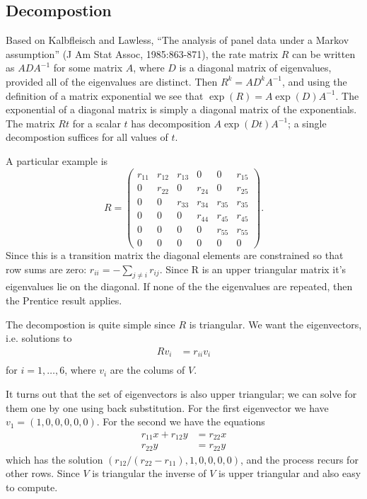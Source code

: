 \documentclass{article}
\begin{document}
\subsection{Decompostion}
Based on Kalbfleisch and Lawless, ``The analysis of panel data under a 
Markov assumption'' (J Am Stat Assoc, 1985:863-871), the
rate matrix $R$ can be written as $ADA^{-1}$ for some matrix $A$, where
$D$ is a diagonal matrix of eigenvalues, provided all of the eigenvalues
are distinct.  Then $R^k = A D^k A^{-1}$, and using the definition of
a matrix exponential we see that
$\exp(R) = A \exp(D) A^{-1}$.  The exponential of a diagonal
matrix is simply a diagonal matrix of the exponentials.
The matrix $Rt$ for a scalar $t$ has decomposition $A\exp(Dt)A^{-1}$; a
single decompostion suffices for all values of $t$.

A particular example is
\begin{equation}
  R =
  \begin{pmatrix}
    r_{11} & r_{12} & r_{13} & 0 & 0 & r_{15}\\
    0 & r_{22} & 0 & r_{24} & 0 & r_{25}\\
    0 & 0 & r_{33} & r_{34} & r_{35} & r_{35}\\
    0 & 0 & 0 & r_{44} & r_{45} & r_{45} \\
    0 & 0 & 0 & 0 & r_{55} & r_{55} \\
    0 & 0 & 0 & 0 & 0 & 0
  \end{pmatrix}.
\end{equation}
Since this is a transition matrix the diagonal elements are constrained so that
row sums are zero: $r_{ii} = -\sum_{j\ne i} r_{ij}$.
Since R is an upper triangular matrix it's eigenvalues lie on the diagonal.
If none of the the eigenvalues are
repeated, then the Prentice result applies.

The decompostion is quite simple since $R$ is triangular.
We want the eigenvectors, i.e. solutions to 
\begin{align*}
  R v_i &= r_{ii} v_i \\
\end{align*}
for $i= 1, \dots, 6$, where $v_i$ are the colums of $V$. 

It turns out that the set of eigenvectors is
also upper triangular; we can solve for them one by one
using back substitution.
For the first eigenvector we have 
$v_1 = (1, 0,0,0,0,0)$.
For the second we have the equations
\begin{align*}
  r_{11} x + r_{12}y &=  r_{22} x \\
             r_{22}y &=  r_{22} y
\end{align*}
which has the solution $(r_{12}/(r_{22}- r_{11}), 1, 0,0,0,0)$,
and the process recurs for other rows.
Since $V$ is triangular the inverse of $V$ is upper triangular
and also easy to compute.
\end{document}
